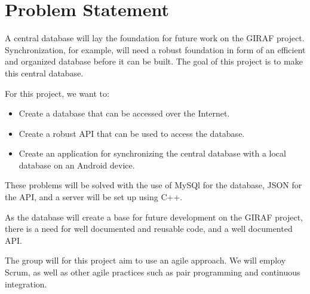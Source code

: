 \section{Problem Statement}
A central database will lay the foundation for future work on the GIRAF project. Synchronization, for example, will need a robust foundation in form of an efficient and organized database before it can be built. The goal of this project is to make this central database.

For this project, we want to:
\begin{itemize}
\item Create a database that can be accessed over the Internet.
\item Create a robust API that can be used to access the database.
\item Create an application for synchronizing the central database with a local database on an Android device.
\end{itemize}

These problems will be solved with the use of MySQl for the database, JSON for the API, and a server will be set up using C++.

As the database will create a base for future development on the GIRAF project, there is a need for well documented and reusable code, and a well documented API.

The group will for this project aim to use an agile approach. We will employ Scrum, as well as other agile practices such as pair programming and continuous integration.